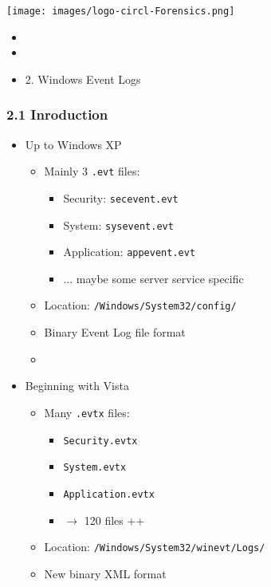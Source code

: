 %
%



\begin{frame}
    \texttt{[image: images/logo-circl-Forensics.png]}
    \begin{itemize}
        \item[]
        \item[]
        \item[] 2. Windows Event Logs
    \end{itemize}
\end{frame}


\begin{frame}[fragile]
  \frametitle{2.1 Inroduction}
    \begin{itemize}
        \item Up to Windows XP
            \begin{itemize}
		    \item Mainly 3 \texttt{.evt} files:
                \begin{itemize}
			\item[] Security:  \texttt{secevent.evt}
			\item[] System:  \texttt{sysevent.evt}
			\item[] Application:  \texttt{appevent.evt}
			\item[] ... maybe some server service specific
                \end{itemize}
		\item Location: \texttt{/Windows/System32/config/}
                \item Binary Event Log file format
		\item[]
            \end{itemize}
        \item Beginning with Vista
            \begin{itemize}
		    \item Many \texttt{.evtx} files:
                \begin{itemize}
			\item[] \texttt{Security.evtx}
			\item[] \texttt{System.evtx}
			\item[] \texttt{Application.evtx}
			\item[] $\to$ 120 files ++
                \end{itemize}
		\item Location: \texttt{/Windows/System32/winevt/Logs/}
                \item New binary XML format
            \end{itemize}
    \end{itemize}
\end{frame}


